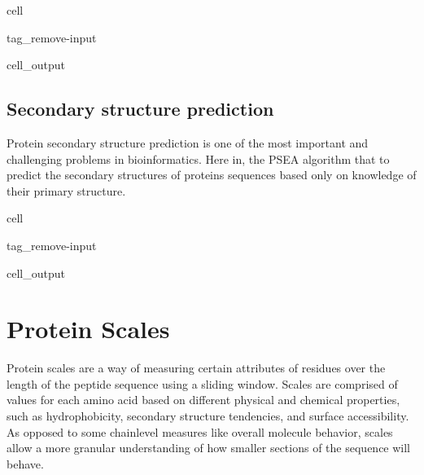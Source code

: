 \documentclass[letterpaper,10pt,english]{jupyterBook}
\begin{document}
\begin{sphinxuseclass}{cell}
\begin{sphinxuseclass}{tag_remove-input}\begin{sphinxVerbatimOutput}

\begin{sphinxuseclass}{cell_output}
\noindent{}

\end{sphinxuseclass}\end{sphinxVerbatimOutput}

\end{sphinxuseclass}
\end{sphinxuseclass}

\section{Secondary structure prediction}
\label{\detokenize{ipynb/chapter2:secondary-structure-prediction}}
\sphinxAtStartPar
Protein secondary structure prediction is one of the most important and challenging problems in bioinformatics. Here in, the P\sphinxhyphen{}SEA algorithm that to predict the secondary structures of proteins sequences based only on knowledge of their primary structure.

\begin{sphinxuseclass}{cell}
\begin{sphinxuseclass}{tag_remove-input}\begin{sphinxVerbatimOutput}

\begin{sphinxuseclass}{cell_output}
\noindent{}

\end{sphinxuseclass}\end{sphinxVerbatimOutput}

\end{sphinxuseclass}
\end{sphinxuseclass}

\chapter{Protein Scales}
\label{\detokenize{ipynb/chapter2:protein-scales}}
\sphinxAtStartPar
Protein scales are a way of measuring certain attributes of residues over the length of the peptide sequence using a sliding window. Scales are comprised of values for each amino acid based on different physical and chemical properties, such as hydrophobicity, secondary structure tendencies, and surface accessibility. As opposed to some chain\sphinxhyphen{}level measures like overall molecule behavior, scales allow a more granular understanding of how smaller sections of the sequence will behave.
\end{document}

